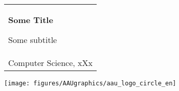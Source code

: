 %
\begin{titlepage}
\vspace*{\fill}
  \addtolength{\hoffset}{0.5\evensidemargin-0.5\oddsidemargin} %
  \noindent%
  {\color{white}\colorbox{aaublue}{\begin{tabular}{@{}p{\textwidth}@{}}
    \begin{center}
    \Huge{\textbf{
      Some Title%
    }}
    \end{center}
    \begin{center}
      \Large{
        Some subtitle%
      }
    \end{center}
    \vspace{0.2cm}
   \begin{center}
    {\Large
      Daniel Runge Petersen, Nutsy Superman%
    }\\
    \vspace{0.2cm}
    {\large
      Computer Science, xXx%
    }
   \end{center}
   \vspace{0.2cm}
   \begin{center}
    {\Large
      Semester Project
    }
   \end{center}
  \end{tabular}}}
  \vfill
  \begin{center}
    \texttt{[image: figures/AAUgraphics/aau\_logo\_circle\_en]}%
  \end{center}
\end{titlepage}
\clearpage
